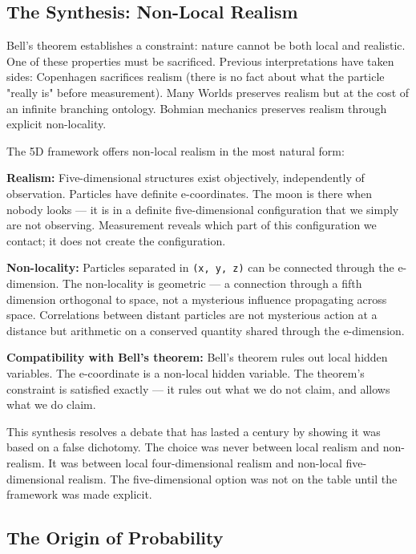 \documentclass[aps,prd,preprint,superscriptaddress,longbibliography,floatfix]{revtex4-2}
\theoremstyle{remark}
\begin{document}
\subsection{The Synthesis: Non-Local Realism}

Bell's theorem establishes a constraint: nature cannot be both local and realistic. One of these properties must be sacrificed. Previous interpretations have taken sides: Copenhagen sacrifices realism (there is no fact about what the particle "really is" before measurement). Many Worlds preserves realism but at the cost of an infinite branching ontology. Bohmian mechanics preserves realism through explicit non-locality.

The 5D framework offers non-local realism in the most natural form:

\textbf{Realism:} Five-dimensional structures exist objectively, independently of observation. Particles have definite e-coordinates. The moon is there when nobody looks --- it is in a definite five-dimensional configuration that we simply are not observing. Measurement reveals which part of this configuration we contact; it does not create the configuration.

\textbf{Non-locality:} Particles separated in \texttt{(x, y, z)} can be connected through the e-dimension. The non-locality is geometric --- a connection through a fifth dimension orthogonal to space, not a mysterious influence propagating across space. Correlations between distant particles are not mysterious action at a distance but arithmetic on a conserved quantity shared through the e-dimension.

\textbf{Compatibility with Bell's theorem:} Bell's theorem rules out local hidden variables. The e-coordinate is a non-local hidden variable. The theorem's constraint is satisfied exactly --- it rules out what we do not claim, and allows what we do claim.

This synthesis resolves a debate that has lasted a century by showing it was based on a false dichotomy. The choice was never between local realism and non-realism. It was between local four-dimensional realism and non-local five-dimensional realism. The five-dimensional option was not on the table until the framework was made explicit.



\subsection{The Origin of Probability}
\end{document}

